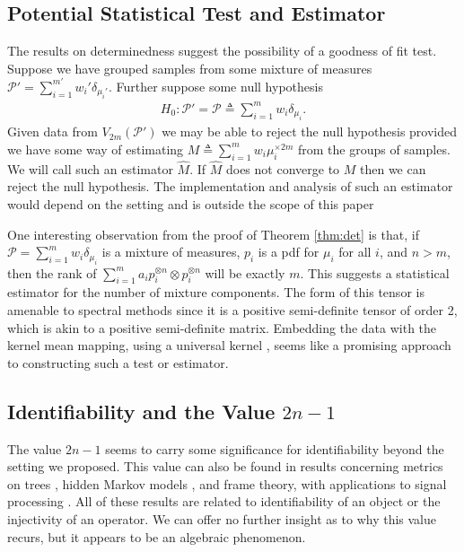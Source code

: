 \documentclass[aos,preprint]{imsart}
\def\sP{\mathscr{P}}
\theoremstyle{plain}
\theoremstyle{defintion}
\begin{document}
	\subsection{Potential Statistical Test and Estimator}
	The results on determinedness suggest the possibility of a goodness of fit test. Suppose we have grouped samples from some mixture of measures $\sP' = \sum_{i=1}^{m'} w_i' \delta_{\mu_i'}$. Further suppose some null hypothesis 
	\begin{align*}
            H_0: \sP' = \sP \triangleq \sum_{i=1}^m w_i \delta_{\mu_i}.
	\end{align*}
	Given data from $V_{2m}\left( \sP' \right)$ we may be able to reject the null hypothesis provided we have some way of estimating $M \triangleq \sum_{i=1}^m w_i \mu_i^{\times 2m}$ from the groups of samples. We will call such an estimator $\widehat{M}$. If $\widehat{M}$ does not converge to $M$ then we can reject the null hypothesis. The implementation and analysis of such an estimator would depend on the setting and is outside the scope of this paper

	One interesting observation from the proof of Theorem \ref{thm:det} is that, if $\sP= \sum_{i=1}^{m}  w_i \delta_{\mu_i}$ is a mixture of measures, $p_i$ is a pdf for $\mu_i$ for all $i$, and $n>m$, then the rank of $\sum_{i=1}^m a_i p_i^{\otimes n} \otimes p_i^{\otimes n}$ will be exactly $m$. This suggests a statistical estimator for the number of mixture components. The form of this tensor is amenable to spectral methods since it is a positive semi-definite tensor of order 2, which is akin to a positive semi-definite matrix. Embedding the data with the kernel mean mapping, using a universal kernel \cite{micchelli06}, seems like a promising approach to constructing such a test or estimator.
	\subsection{Identifiability and the Value $2n-1$}
	The value $2n-1$ seems to carry some significance for identifiability beyond the setting we proposed. This value can also be found in results concerning metrics on trees \cite{pachter04}, hidden Markov models \cite{paz71}, and frame theory, with applications to signal processing \cite{balan06}. All of these results are related to identifiability of an object or the injectivity of an operator. We can offer no further insight as to why this value recurs, but it appears to be an algebraic phenomenon.

	
	
	
\end{document}
